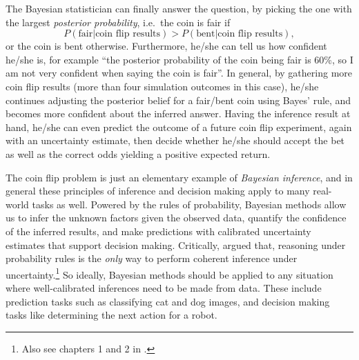 The Bayesian statistician can finally answer the question, by picking the one with the largest \emph{posterior probability}, i.e.~the coin is fair if 
$$P(\text{fair} | \text{coin flip results} ) > P(\text{bent} | \text{coin flip results} ),$$
or the coin is bent otherwise. Furthermore, he/she can tell us how confident he/she is, for example ``the posterior probability of the coin being fair is $60\%$, so I am not very confident when saying the coin is fair''. In general, by gathering more coin flip results (more than four simulation outcomes in this case), he/she continues adjusting the posterior belief for a fair/bent coin using Bayes' rule, and becomes more confident about the inferred answer. Having the inference result at hand, he/she can even predict the outcome of a future coin flip experiment, again with an uncertainty estimate, then decide whether he/she should accept the bet as well as the correct odds yielding a positive expected return.

The coin flip problem is just an elementary example of \emph{Bayesian inference}, and in general these principles of inference and decision making apply to many real-world tasks as well. Powered by the rules of probability, Bayesian methods allow us to infer the unknown factors given the observed data, quantify the confidence of the inferred results, and make predictions with calibrated uncertainty estimates that support decision making. Critically, \cite{cox:axioms1946} argued that, reasoning under probability rules is the \emph{only} way to perform coherent inference under uncertainty.\footnote{Also see chapters 1 and 2 in \cite{jaynes:book2003}.} So ideally, Bayesian methods should be applied to any situation where well-calibrated inferences need to be made from data. These include prediction tasks such as classifying cat and dog images, and decision making tasks like determining the next action for a robot.


